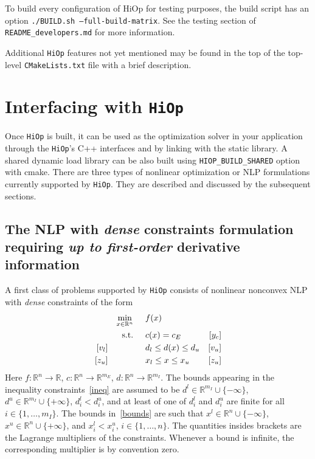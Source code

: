 \documentclass[11pt]{article}
\newcounter{line}
\newcommand{\Hi}{\texttt{HiOp}\xspace}
\begin{document}
To build every configuration of HiOp for testing purposes, the build script has an option \texttt{./BUILD.sh --full-build-matrix}. See the testing section of \texttt{README\_developers.md} for more information.

Additional \Hi features not yet mentioned may be found in the top of the top-level \texttt{CMakeLists.txt} file with a brief description.

\section{Interfacing with \Hi}
Once \Hi is built, it can be used as the optimization solver in your application through the \Hi's C++ interfaces and by linking with the static library. A shared dynamic load library can be also built using \texttt{HIOP\_BUILD\_SHARED} option with cmake. There are three types of nonlinear optimization or NLP formulations currently supported by \Hi. They are described and discussed by the subsequent sections.

\subsection{The NLP with \textit{dense} constraints formulation requiring \textit{up to first-order} derivative information}
A first class of problems supported by \Hi consists of nonlinear nonconvex NLP with \textit{dense} constraints of the form
\begin{align}
&&&&\min_{x\in\mathbb{R}^n} & \hspace{0.5cm} f(x) &&&& \label{obj}\\
&&&&\textnormal{s.t.} &\hspace{0.5cm}  c(x)=c_E &[y_c]&&&\\
&&[v_l]&&& \hspace{0.5cm} d_l \leq d(x) \leq d_u  &[v_u]&&&\label{ineq} \\
&&[z_u]&&& \hspace{0.5cm} x_l \leq x \leq x_u & [z_u] &&&\label{bounds}
\end{align}
Here $f:\mathbb{R}^n\rightarrow\mathbb{R}$, $c:\mathbb{R}^n\rightarrow\mathbb{R}^{m_E}$, $d:\mathbb{R}^n\rightarrow\mathbb{R}^{m_I}$. The bounds appearing in the inequality constraints~\eqref{ineq} are assumed to be $d^l\in\mathbb{R}^{m_I}\cup\{-\infty\}$, $d^u\in\mathbb{R}^{m_I}\cup\{+\infty\}$, $d_i^l < d_i^u$, and at least of one of $d_i^l$ and $d_i^u$ are finite for all $i\in\{1,\ldots,m_I\}$. The bounds in~\eqref{bounds} are such that $x^l\in\mathbb{R}^{n}\cup\{-\infty\}$, $x^u\in\mathbb{R}^{n}\cup\{+\infty\}$, and $x_i^l < x_i^u$, $i\in\{1,\ldots,n\}$. The quantities insides brackets are the Lagrange multipliers of the constraints. Whenever a bound is infinite, the corresponding multiplier is by convention zero.
\end{document}
